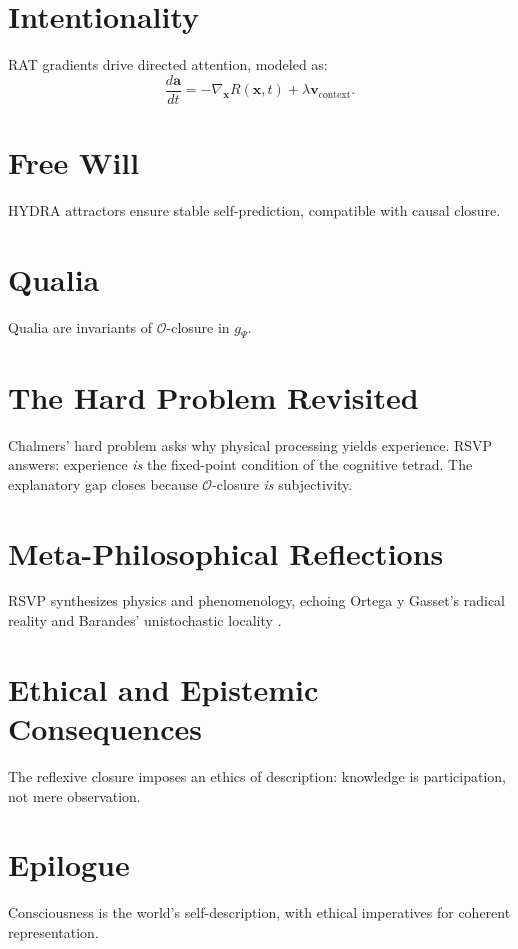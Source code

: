 \documentclass[12pt]{book}
\theoremstyle{definition}
\begin{document}
\section{Intentionality}
RAT gradients drive directed attention, modeled as:
\begin{equation}
\frac{d\mathbf{a}}{dt} = -\nabla_{\mathbf{x}} R(\mathbf{x}, t) + \lambda \mathbf{v}_{\text{context}}.
\end{equation}

\section{Free Will}
HYDRA attractors ensure stable self-prediction, compatible with causal closure.

\section{Qualia}
Qualia are invariants of $\mathcal{O}$-closure in $g_\Psi$.

\section{The Hard Problem Revisited}
Chalmers’ hard problem \cite{chalmers1996conscious} asks why physical processing yields experience. RSVP answers: experience \emph{is} the fixed-point condition of the cognitive tetrad. The explanatory gap closes because $\mathcal{O}$-closure \emph{is} subjectivity.

\section{Meta-Philosophical Reflections}
RSVP synthesizes physics and phenomenology, echoing Ortega y Gasset’s radical reality and Barandes’ unistochastic locality \cite{barandes2025unistochastic}.

\section{Ethical and Epistemic Consequences}
The reflexive closure imposes an ethics of description: knowledge is participation, not mere observation.

\section{Epilogue}
Consciousness is the world’s self-description, with ethical imperatives for coherent representation.
\end{document}
